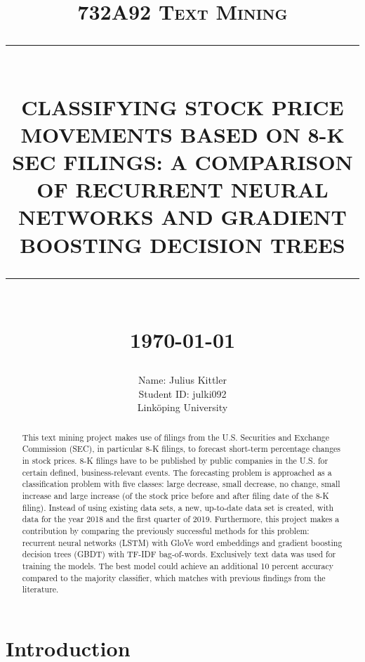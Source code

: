 \documentclass{article}
\newcommand{\HRule}[1]{\rule{\linewidth}{#1}}
\begin{document}
	
	\title{\textsc{732A92 Text Mining} \\ [2.0cm]
		\HRule{0.5pt} \\
		\LARGE \textbf{\uppercase{Classifying Stock Price Movements based on 8-K SEC filings: A comparison of Recurrent Neural Networks and Gradient Boosting Decision Trees}}
		\HRule{2pt} \\ [0.5cm]
		\normalsize \today \vspace*{5\baselineskip}}
	
	\date{}
	
	\author{
		Name: Julius Kittler \\ 
		Student ID: julki092 \\ 
		Link\"{o}ping University}
	
	\maketitle
	\newpage
	
	\begin{abstract}
		
	This text mining project makes use of filings from the U.S. Securities and Exchange Commission (SEC), in particular 8-K filings, to forecast short-term percentage changes in stock prices. 8-K filings have to be published by public companies in the U.S. for certain defined, business-relevant events. The forecasting problem is approached as a classification problem with five classes: large decrease, small decrease, no change, small increase and large increase (of the stock price before and after filing date of the 8-K filing). Instead of using existing data sets, a new, up-to-date data set is created, with data for the year 2018 and the first quarter of 2019. Furthermore, this project makes a contribution by comparing the previously successful methods for this problem: recurrent neural networks (LSTM) with GloVe word embeddings and gradient boosting decision trees (GBDT) with TF-IDF bag-of-words. Exclusively text data was used for training the models. The best model could achieve an additional 10 percent accuracy compared to the majority classifier, which matches with previous findings from the literature.
	
	\end{abstract}

	\newpage
	\tableofcontents
	\newpage
	\listoffigures
	\listoftables
	\newpage

	\section{Introduction}
	
\end{document}
